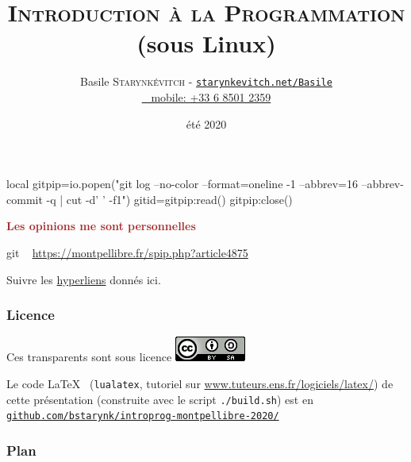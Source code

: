 \documentclass[xcolor=svgnames,final,smaller,a4]{beamer}
\title{\textsc{Introduction à la Programmation} \\
(sous Linux)}
\author[B.Starynkevitch]{Basile \textsc{Starynkévitch} - \href{http://starynkevitch.net/Basile/}{\texttt{starynkevitch.net/Basile}}\\ \href{mailto:basile@starynkevitch.net}{\color{blue}{\texttt{basile@starynkevitch.net}} ~ mobile: +33 6 8501 2359}
} %
\institute{MontPelibre (Montpellier)}
\date{été 2020}
\begin{document}
 \begin{luacode*}
   local gitpip=io.popen("git log --no-color --format=oneline -1 --abbrev=16 --abbrev-commit -q | cut -d' ' -f1")
   gitid=gitpip:read()
   gitpip:close()
 \end{luacode*}
  \newcommand{\mygitid}{\luadirect{tex.print(gitid)}}

 \begin{frame}
   
   
   \begin{relsize}{-1.5}
        \titlepage
        \textcolor{brown}{{\large \textbf{Les opinions me sont personnelles}} }
        
        \begin{center}
          git \texttt{\mygitid} ~ 
          \href{https://montpellibre.fr/spip.php?article4875}{https://montpellibre.fr/spip.php?article4875}

          Suivre les \href{https://fr.wikipedia.org/wiki/Hyperlien}{hyperliens} donnés ici.
        \end{center}
   \end{relsize}
\end{frame}

 \begin{frame}
    \frametitle{Licence}
    
    Ces transparents sont sous licence \href{https://creativecommons.org/licenses/by-sa/4.0/}{\includegraphics[scale=0.75]{CC-BY-SA-4}} 

    \vspace{1cm} Le code \LaTeX ~ (\texttt{lualatex}, tutoriel sur \href{https://www.tuteurs.ens.fr/logiciels/latex/}{www.tuteurs.ens.fr/logiciels/latex/}) de cette
    présentation (construite avec le script \texttt{./build.sh}) est
    en
    \href{https://github.com/bstarynk/introprog-montpellibre-2020/}{\texttt{github.com/bstarynk/introprog-montpellibre-2020/}}
 \end{frame}
 
 \begin{frame}
    \frametitle{Plan}
    
   \tableofcontents
 \end{frame}


\end{document}
